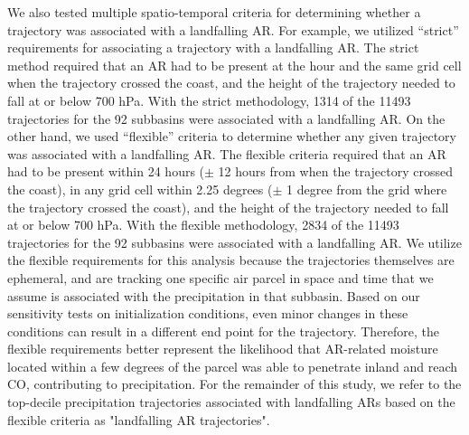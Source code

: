 \documentclass[draft]{agujournal2019}
\begin{document}
We also tested multiple spatio-temporal criteria for determining whether a trajectory was associated with a landfalling AR. For example, we utilized “strict” requirements for associating a trajectory with a landfalling AR. The strict method required that an AR had to be present at the hour and the same grid cell when the trajectory crossed the coast, and the height of the trajectory needed to fall at or below 700 hPa. With the strict methodology, 1314 of the 11493 trajectories for the 92 subbasins were associated with a landfalling AR. On the other hand, we used “flexible” criteria to determine whether any given trajectory was associated with a landfalling AR. The flexible criteria required that an AR had to be present within 24 hours ($\pm$ 12 hours from when the trajectory crossed the coast), in any grid cell within 2.25 degrees ($\pm$ 1 degree from the grid where the trajectory crossed the coast), and the height of the trajectory needed to fall at or below 700 hPa. With the flexible methodology, 2834 of the 11493 trajectories for the 92 subbasins were associated with a landfalling AR. We utilize the flexible requirements for this analysis because the trajectories themselves are ephemeral, and are tracking one specific air parcel in space and time that we assume is associated with the precipitation in that subbasin. Based on our sensitivity tests on initialization conditions, even minor changes in these conditions can result in a different end point for the trajectory. Therefore, the flexible requirements better represent the likelihood that AR-related moisture located within a few degrees of the parcel was able to penetrate inland and reach CO, contributing to precipitation. For the remainder of this study, we refer to the top-decile precipitation trajectories associated with landfalling ARs based on the flexible criteria as "landfalling AR trajectories". 

%
%
%
\end{document}
